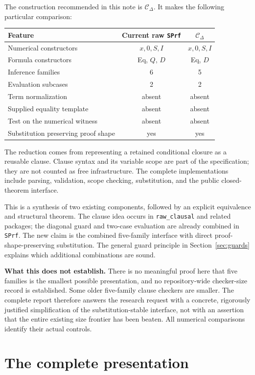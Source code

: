 \documentclass[11pt]{article}
\theoremstyle{definition}\newtheorem{definition}[theorem]{Definition}
\theoremstyle{remark}\newtheorem{remark}[theorem]{Remark}
\newcommand{\Cd}{\ensuremath{\mathcal C_{\Delta}}}
\begin{document}
The construction recommended in this note is \Cd. It makes the following particular comparison:
\begin{center}
\begin{tabular}{lcc}
\toprule
Feature & Current raw \texttt{SPrf} & \Cd\\
\midrule
Numerical constructors & $x,0,S,I$ & $x,0,S,I$\\
Formula constructors & Eq, $Q$, $D$ & Eq, $D$\\
Inference families & 6 & 5\\
Evaluation subcases & 2 & 2\\
Term normalization & absent & absent\\
Supplied equality template & absent & absent\\
Test on the numerical witness & absent & absent\\
Substitution preserving proof shape & yes & yes\\
\bottomrule
\end{tabular}
\end{center}
The reduction comes from representing a retained conditional closure as a reusable clause. Clause syntax and its variable scope are part of the specification; they are not counted as free infrastructure. The complete implementations include parsing, validation, scope checking, substitution, and the public closed-theorem interface.

This is a synthesis of two existing components, followed by an explicit equivalence and structural theorem. The clause idea occurs in \texttt{raw\_clausal} and related packages; the diagonal guard and two-case evaluation are already combined in \texttt{SPrf}. The new claim is the combined five-family interface with direct proof-shape-preserving substitution. The general guard principle in Section~\ref{sec:guards} explains which additional combinations are sound.

\textbf{What this does not establish.} There is no meaningful proof here that five families is the smallest possible presentation, and no repository-wide checker-size record is established. Some older five-family clause checkers are smaller. The complete report therefore answers the research request with a concrete, rigorously justified simplification of the substitution-stable interface, not with an assertion that the entire existing size frontier has been beaten. All numerical comparisons identify their actual controls.

\section{The complete presentation}
\label{sec:calculus}
\end{document}

